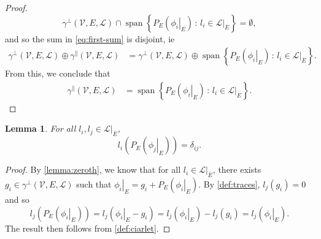 \documentclass[sn-mathphys-num]{sn-jnl}%
\theoremstyle{thmstyleone}%
\newtheorem{lemma}{Lemma}%
\newcommand{\closure}[1]{\overline{#1}}
\newcommand{\subentity}{E}
\newcommand{\polyspace}{\mathcal{V}}
\newcommand{\dualbasis}{\mathcal{L}}
\newcommand{\unctrace}[3]{\gamma^\perp(#1,#2,#3)}
\newcommand{\ctrace}[3]{\gamma^\parallel(#1,#2,#3)}
\theoremstyle{thmstyletwo}%
\theoremstyle{thmstylethree}%
\begin{document}
\begin{proof}
\[\unctrace{\polyspace}{\subentity}{\dualbasis}
\cap
\operatorname{span}\left\{P_{\subentity}\left(\left.\phi_i\right|_{\subentity}\right)\,:\,l_i\in\left.\dualbasis\right|_{\closure{\subentity}}\right\}
=\emptyset,\] and so the sum in \cref{eq:first-sum} is disjoint, ie
\begin{align*}
\unctrace{\polyspace}{\subentity}{\dualbasis}\oplus\ctrace{\polyspace}{\subentity}{\dualbasis}
&=
\unctrace{\polyspace}{\subentity}{\dualbasis}
\oplus
\operatorname{span}\left\{P_{\subentity}\left(\left.\phi_i\right|_{\subentity}\right)\,:\,l_i\in\left.\dualbasis\right|_{\closure{\subentity}}\right\}.
\end{align*}
From this, we conclude that
\begin{align*}
\ctrace{\polyspace}{\subentity}{\dualbasis}
&=
\operatorname{span}\left\{P_{\subentity}\left(\left.\phi_i\right|_{\subentity}\right)\,:\,l_i\in\left.\dualbasis\right|_{\closure{\subentity}}\right\}.
\end{align*}
\end{proof}

\begin{lemma}\label{sublemma}
For all $l_i,l_j\in\left.\dualbasis\right|_{\closure{\subentity}}$,
\[l_i\left(P_{\subentity}\left(\left.\phi_j\right|_{\subentity}\right)\right)=\delta_{ij}.\]
\end{lemma}
\begin{proof}
By \cref{lemma:zeroth}, we know that for all $l_i\in\left.\dualbasis\right|_{\closure{\subentity}}$,
there exists $g_i\in\unctrace{\polyspace}{\subentity}{\dualbasis}$ such that
\(\left.\phi_i\right|_{\subentity}=g_i+P_{\subentity}\left(\left.\phi_i\right|_{\subentity}
\right)\). By \cref{def:traces}, $l_j(g_i)=0$ and so
\[
l_j\left(P_{\subentity}\left(\left.\phi_i\right|_{\subentity}\right)\right)
=
l_j\left(\left.\phi_i\right|_{\subentity}-g_i\right)
=
l_j\left(\left.\phi_i\right|_{\subentity}\right)-l_j\left(g_i\right)
=
l_j\left(\left.\phi_i\right|_{\subentity}\right).
\]
The result then follows from \cref{def:ciarlet}.
\end{proof}
\end{document}
